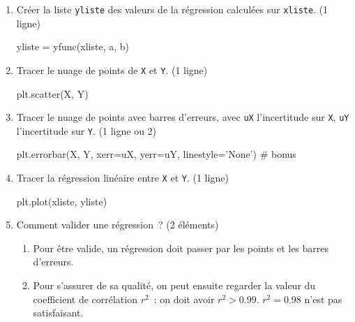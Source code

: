 \documentclass[a4paper, 12pt, final, garamond]{book}
\begin{document}
\begin{enumerate}[label=\sqenumi]
    \item Créer la liste \texttt{yliste} des valeurs de la régression calculées sur
        \texttt{xliste}. \hfill (1 ligne)
        \begin{solution}
            \begin{python}
yliste = yfunc(xliste, a, b)
            \end{python}
\end{solution}

    \item Tracer le nuage de points de \texttt{X} et \texttt{Y}. \hfill (1
        ligne)
        \begin{solution}
            \begin{python}
plt.scatter(X, Y)
            \end{python}
\end{solution}

    \item Tracer le nuage de points avec barres d'erreurs, avec \texttt{uX}
        l'incertitude sur \texttt{X}, \texttt{uY} l'incertitude sur \texttt{Y}.
        (1 ligne ou 2)
        \begin{solution}
            \begin{python}
plt.errorbar(X, Y, xerr=uX, yerr=uY,
             linestyle='None') # bonus
            \end{python}
\end{solution}

    \item Tracer la régression linéaire entre \texttt{X} et \texttt{Y}. \hfill
        (1 ligne)
        \begin{solution}
            \begin{python}
plt.plot(xliste, yliste)
            \end{python}
\end{solution}

    \item Comment valider une régression~? \hfill (2 éléments)
        \begin{solution}
            \begin{enumerate}
                \item Pour être valide, un régression doit passer par les points
                    et les barres d'erreurs. 
                \item Pour s'assurer de sa qualité, on peut ensuite regarder la
                    valeur du coefficient de corrélation $r^2$~: on doit avoir
                    $r^2 > \num{0.99}$. $r^2 = \num{0.98}$ n'est pas
                    satisfaisant.
            \end{enumerate}
\end{solution}


\end{enumerate}
\end{document}

